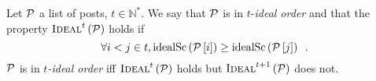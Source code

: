\begin{definition}
  Let $\mathcal{P}$ a list of posts, $t \in \mathbb{N}^*$. We say that $\mathcal{P}$
  is in $t$-\emph{ideal order} and that the property
  $\textsc{Ideal}^{t}\left(\mathcal{P}\right)$ holds if
  \begin{equation*}
    \forall i < j \in t, \mathrm{idealSc}\left(\mathcal{P}\left[i\right]\right) \geq
    \mathrm{idealSc}\left(\mathcal{P}\left[j\right]\right) \enspace.
  \end{equation*}
  $\mathcal{P}$ is in \emph{$t$-ideal order} iff
  $\textsc{Ideal}^t\left(\mathcal{P}\right)$ holds but
  $\textsc{Ideal}^{t+1}\left(\mathcal{P}\right)$ does not.
\end{definition}
